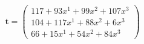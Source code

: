 \documentclass[preview]{standalone}
\begin{document}
\begin{align*}
\mathbf{t} = \begin{pmatrix}117 + 93x^{1} + 99x^{2} + 107x^{3} \\ 104 + 117x^{1} + 88x^{2} + 6x^{3} \\ 66 + 15x^{1} + 54x^{2} + 84x^{3}\end{pmatrix}
\end{align*}
\end{document}
